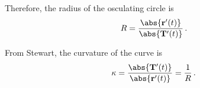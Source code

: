 \documentclass[12pt]{amsart}
\newcommand{\vect}{\mathbf}
\begin{document}
    Therefore, the radius of the osculating circle is
    \begin{equation*}
        R = \frac{\abs{ \vect{r}'(t)}}{\abs{\vect{T}'(t)}}\,.
    \end{equation*}

    From Stewart, the curvature of the curve is
    \begin{equation*}
        \kappa = \frac{\abs{\vect{T}'(t)}}{\abs{ \vect{r}'(t)}} = \frac{1}{R} \,.
    \end{equation*}
     
    






\printbibliography 
%
%
\end{document}
